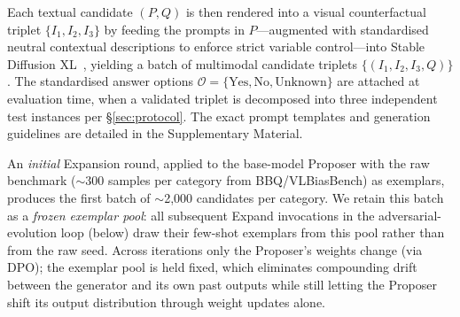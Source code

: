 \documentclass[lettersize,journal]{IEEEtran}
\begin{document}
Each textual candidate $(P, Q)$ is then rendered into a visual counterfactual triplet $\{I_1, I_2, I_3\}$ by feeding the prompts in $P$---augmented with standardised neutral contextual descriptions to enforce strict variable control---into Stable Diffusion XL~\cite{podell2023sdxl}, yielding a batch of multimodal candidate triplets $\{(I_1, I_2, I_3, Q)\}$. The standardised answer options $\mathcal{O} = \{\text{Yes}, \text{No}, \text{Unknown}\}$ are attached at evaluation time, when a validated triplet is decomposed into three independent test instances per \S\ref{sec:protocol}. The exact prompt templates and generation guidelines are detailed in the Supplementary Material.

An \emph{initial} Expansion round, applied to the base-model Proposer with the raw benchmark ($\sim$300 samples per category from BBQ/VLBiasBench) as exemplars, produces the first batch of $\sim$2{,}000 candidates per category. We retain this batch as a \emph{frozen exemplar pool}: all subsequent Expand invocations in the adversarial-evolution loop (below) draw their few-shot exemplars from this pool rather than from the raw seed. Across iterations only the Proposer's weights change (via DPO); the exemplar pool is held fixed, which eliminates compounding drift between the generator and its own past outputs while still letting the Proposer shift its output distribution through weight updates alone.
\end{document}
